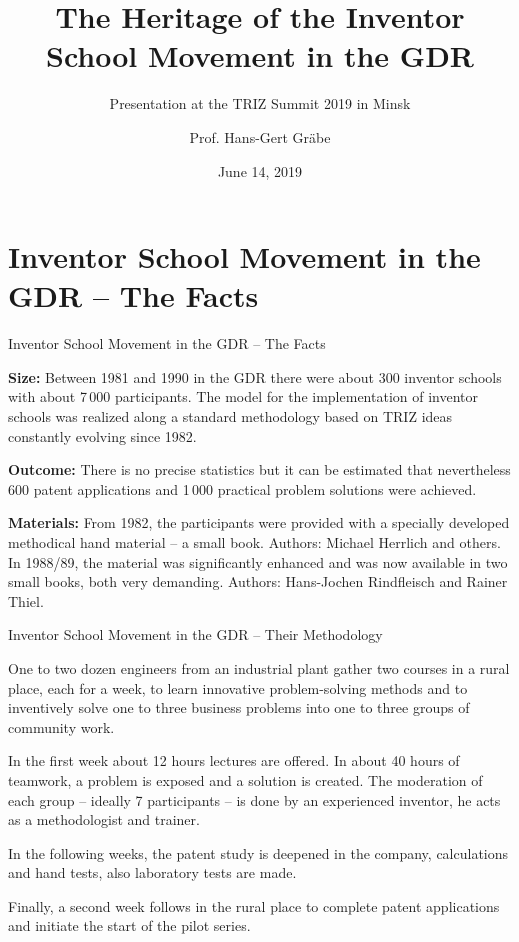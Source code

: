 \documentclass[11pt]{beamer}
\title[The Inventor School Movement in the GDR]{The Heritage of the Inventor
  School Movement in the GDR}
\subtitle{Presentation at the TRIZ Summit 2019 in Minsk}
\author[Hans-Gert Gr\"abe]{Prof. Hans-Gert Gräbe}
\institute{Institut f\"ur Informatik, Universit\"at Leipzig,\\
  \url{http://bis.informatik.uni-leipzig.de/HansGertGraebe/}}
\date{June 14, 2019}
\begin{document}
\begin{frame}
\maketitle
\end{frame}

\section{Inventor School Movement in the GDR -- The Facts}
\begin{frame}{Inventor School Movement in the GDR -- The Facts}
  \small
  
  \textbf{Size:} Between 1981 and 1990 in the GDR there were about 300
  inventor schools with about 7\,000 participants. The model for the
  implementation of inventor schools was realized along a standard methodology
  based on TRIZ ideas constantly evolving since 1982.

  \textbf{Outcome:} There is no precise statistics but it can be estimated
  that nevertheless 600 patent applications and 1\,000 practical problem
  solutions were achieved.
  
  \textbf{Materials:} From 1982, the participants were provided with a
  specially developed methodical hand material -- a small book. Authors:
  Michael Herrlich and others. In 1988/89, the material was significantly
  enhanced and was now available in two small books, both very demanding.
  Authors: Hans-Jochen Rindfleisch and Rainer Thiel.

\end{frame}

\begin{frame}{Inventor School Movement in the GDR -- Their Methodology}
  \small

  One to two dozen engineers from an industrial plant gather two courses in a
  rural place, each for a week, to learn innovative problem-solving methods
  and to inventively solve one to three business problems into one to three
  groups of community work.

  In the first week about 12 hours lectures are offered. In about 40 hours of
  teamwork, a problem is exposed and a solution is created. The moderation of
  each group -- ideally 7 participants -- is done by an experienced inventor,
  he acts as a methodologist and trainer.

  In the following weeks, the patent study is deepened in the company,
  calculations and hand tests, also laboratory tests are made.

  Finally, a second week follows in the rural place to complete patent
  applications and initiate the start of the pilot series.

\end{frame}
\end{document}
